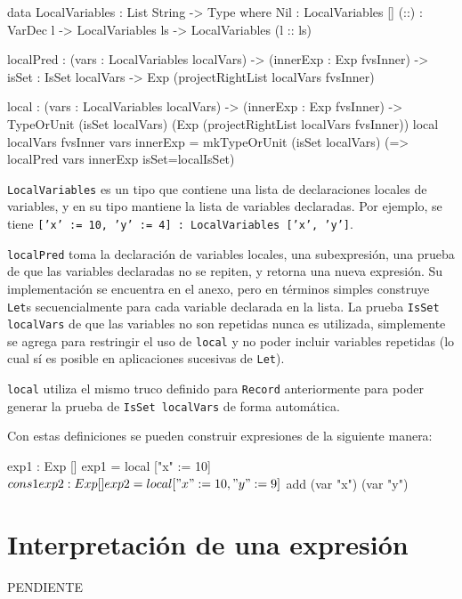\begin{code}
data LocalVariables : List String -> Type where
  Nil : LocalVariables []
  (::) : VarDec l -> LocalVariables ls -> 
    LocalVariables (l :: ls) 

localPred : (vars : LocalVariables localVars) -> 
  (innerExp : Exp fvsInner) -> {isSet : IsSet localVars} -> 
  Exp (projectRightList localVars fvsInner)

local : (vars : LocalVariables localVars) -> 
  (innerExp : Exp fvsInner) -> 
  TypeOrUnit 
    (isSet localVars) 
    (Exp (projectRightList localVars fvsInner))
local {localVars} {fvsInner} vars innerExp = 
  mkTypeOrUnit (isSet localVars)
    (\localIsSet => localPred vars innerExp {isSet=localIsSet}) 
\end{code}

\texttt{LocalVariables} es un tipo que contiene una lista de declaraciones locales de variables, y en su tipo mantiene la lista de variables declaradas. Por ejemplo, se tiene \texttt{['x' := 10, 'y' := 4] : LocalVariables ['x', 'y']}.

\texttt{localPred} toma la declaración de variables locales, una subexpresión, una prueba de que las variables declaradas no se repiten, y retorna una nueva expresión. Su implementación se encuentra en el anexo, pero en términos simples construye \texttt{Let}s secuencialmente para cada variable declarada en la lista. La prueba \texttt{IsSet localVars} de que las variables no son repetidas nunca es utilizada, simplemente se agrega para restringir el uso de \texttt{local} y no poder incluir variables repetidas (lo cual sí es posible en aplicaciones sucesivas de \texttt{Let}).

\texttt{local} utiliza el mismo truco definido para \texttt{Record} anteriormente para poder generar la prueba de \texttt{IsSet localVars} de forma automática.

Con estas definiciones se pueden construir expresiones de la siguiente manera:

\begin{code}
exp1 : Exp []
exp1 = local ["x" := 10] $ cons 1

exp2 : Exp []
exp2 = local ["x" := 10, "y" := 9] $ add (var "x") (var "y")
\end{code}


\section{Interpretación de una expresión}

PENDIENTE
